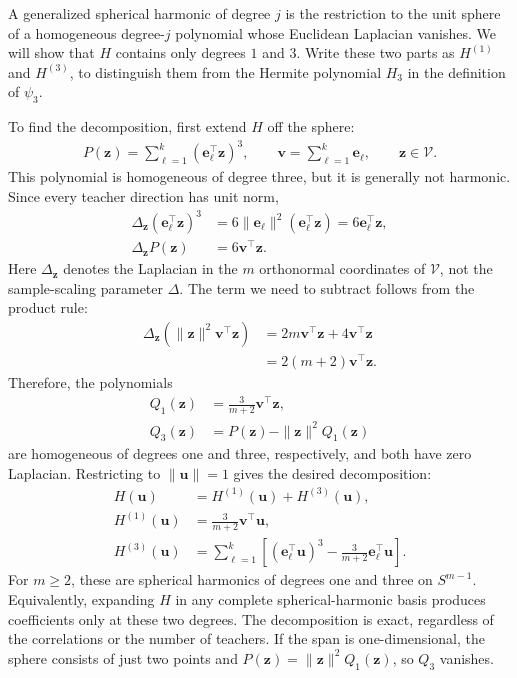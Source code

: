 \documentclass[11pt, reqno]{amsart}
\theoremstyle{notestyle}
\theoremstyle{defstyle}
\begin{document}
A generalized spherical harmonic of degree $j$ is the restriction to the unit sphere of a homogeneous degree-$j$ polynomial whose Euclidean Laplacian vanishes.
We will show that $H$ contains only degrees $1$ and $3$.
Write these two parts as $H^{(1)}$ and $H^{(3)}$, to distinguish them from the Hermite polynomial $H_3$ in the definition of $\psi_3$.

To find the decomposition, first extend $H$ off the sphere:
\begin{align*}
    P(\mathbf z) = \sum_{\ell=1}^k (\mathbf e_\ell^\top\mathbf z)^3,
    \qquad \mathbf v = \sum_{\ell=1}^k \mathbf e_\ell,
    \qquad \mathbf z\in\mathcal V.
\end{align*}
This polynomial is homogeneous of degree three, but it is generally not harmonic.
Since every teacher direction has unit norm,
\begin{align*}
    \Delta_{\mathbf z}(\mathbf e_\ell^\top\mathbf z)^3
    &= 6\|\mathbf e_\ell\|^2(\mathbf e_\ell^\top\mathbf z)
    = 6\mathbf e_\ell^\top\mathbf z, \\
    \Delta_{\mathbf z}P(\mathbf z) &= 6\mathbf v^\top\mathbf z.
\end{align*}
Here $\Delta_{\mathbf z}$ denotes the Laplacian in the $m$ orthonormal coordinates of $\mathcal V$, not the sample-scaling parameter $\Delta$.
The term we need to subtract follows from the product rule:
\begin{align*}
    \Delta_{\mathbf z}\left(\|\mathbf z\|^2\mathbf v^\top\mathbf z\right)
    &= 2m\mathbf v^\top\mathbf z+4\mathbf v^\top\mathbf z \\
    &= 2(m+2)\mathbf v^\top\mathbf z.
\end{align*}
Therefore, the polynomials
\begin{align*}
    Q_1(\mathbf z) &= \frac{3}{m+2}\mathbf v^\top\mathbf z, \\
    Q_3(\mathbf z) &= P(\mathbf z)-\|\mathbf z\|^2Q_1(\mathbf z)
\end{align*}
are homogeneous of degrees one and three, respectively, and both have zero Laplacian.
Restricting to $\|\mathbf u\|=1$ gives the desired decomposition:
\begin{align}
    H(\mathbf u) &= H^{(1)}(\mathbf u)+H^{(3)}(\mathbf u),
    \label{eq:H-harmonic-decomposition} \\
    H^{(1)}(\mathbf u) &= \frac{3}{m+2}\mathbf v^\top\mathbf u,
    \label{eq:H-degree-one} \\
    H^{(3)}(\mathbf u)
    &= \sum_{\ell=1}^k\left[(\mathbf e_\ell^\top\mathbf u)^3
    -\frac{3}{m+2}\mathbf e_\ell^\top\mathbf u\right].
    \label{eq:H-degree-three}
\end{align}
For $m\geq2$, these are spherical harmonics of degrees one and three on $S^{m-1}$.
Equivalently, expanding $H$ in any complete spherical-harmonic basis produces coefficients only at these two degrees.
The decomposition is exact, regardless of the correlations or the number of teachers.
If the span is one-dimensional, the sphere consists of just two points and $P(\mathbf z)=\|\mathbf z\|^2Q_1(\mathbf z)$, so $Q_3$ vanishes.
\end{document}
